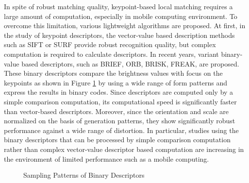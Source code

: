 In spite of robust matching quality, keypoint-based local matching requires a large amount of computation, especially in mobile computing environment. To overcome this limitation, various lightweight algorithms are proposed. At first, in the study of keypoint descriptors, the vector-value based description methods such as SIFT\cite{lowe_distinctive_2004} or SURF\cite{bay_speeded-up_2008} provide robust recognition quality, but complex computation is required to calculate descriptors. In recent years, variant binary-value based descriptors, such as  BRIEF\cite{calonder_brief:_2010}, ORB\cite{rublee_orb:_2011}, BRISK\cite{leutenegger_brisk:_2011}, FREAK\cite{alahi_freak:_2012}, are proposed. These binary descriptors compare the brightness values with focus on the keypoints as shown in Figure \ref{fig:markerless_binary_patterns} by using a wide range of form patterns and express the results in binary codes. Since descriptors are computed only by a simple comparison computation, its computational speed is significantly faster than vector-based descriptors. Moreover, since the orientation and scale are normalized on the basis of generation patterns, they show significantly robust performance against a wide range of distortion. In particular, studies using the binary descriptors that can be processed by simple comparison computation rather than complex vector-value descriptor based computation are increasing in the environment of limited performance such as a mobile computing.  

\begin{figure}[hb!]
  \centering     %
    \hfill
  \caption{Sampling Patterns of Binary Descriptors}
    \label{fig:markerless_binary_patterns}
\end{figure}


